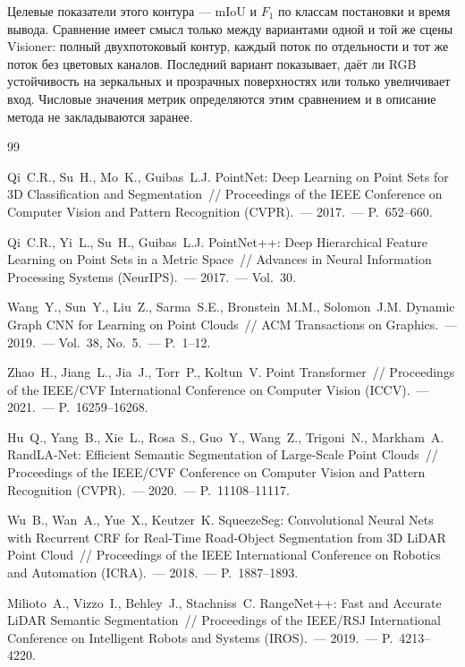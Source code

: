 \documentclass{misisarticle}
\begin{document}
Целевые показатели этого контура --- mIoU и $F_1$ по классам постановки и время вывода. Сравнение имеет смысл только между вариантами одной и той же сцены Visioner: полный двухпотоковый контур, каждый поток по отдельности и тот же поток без цветовых каналов. Последний вариант показывает, даёт ли RGB устойчивость на зеркальных и прозрачных поверхностях или только увеличивает вход. Числовые значения метрик определяются этим сравнением и в описание метода не закладываются заранее.

\begin{thebibliography}{99}

 Qi~C.R., Su~H., Mo~K., Guibas~L.J. PointNet: Deep Learning on Point Sets for 3D Classification and Segmentation~// Proceedings of the IEEE Conference on Computer Vision and Pattern Recognition (CVPR).~--- 2017.~--- P.~652--660.

 Qi~C.R., Yi~L., Su~H., Guibas~L.J. PointNet++: Deep Hierarchical Feature Learning on Point Sets in a Metric Space~// Advances in Neural Information Processing Systems (NeurIPS).~--- 2017.~--- Vol.~30.

 Wang~Y., Sun~Y., Liu~Z., Sarma~S.E., Bronstein~M.M., Solomon~J.M. Dynamic Graph CNN for Learning on Point Clouds~// ACM Transactions on Graphics.~--- 2019.~--- Vol.~38, No.~5.~--- P.~1--12.

 Zhao~H., Jiang~L., Jia~J., Torr~P., Koltun~V. Point Transformer~// Proceedings of the IEEE/CVF International Conference on Computer Vision (ICCV).~--- 2021.~--- P.~16259--16268.

 Hu~Q., Yang~B., Xie~L., Rosa~S., Guo~Y., Wang~Z., Trigoni~N., Markham~A. RandLA-Net: Efficient Semantic Segmentation of Large-Scale Point Clouds~// Proceedings of the IEEE/CVF Conference on Computer Vision and Pattern Recognition (CVPR).~--- 2020.~--- P.~11108--11117.

 Wu~B., Wan~A., Yue~X., Keutzer~K. SqueezeSeg: Convolutional Neural Nets with Recurrent CRF for Real-Time Road-Object Segmentation from 3D LiDAR Point Cloud~// Proceedings of the IEEE International Conference on Robotics and Automation (ICRA).~--- 2018.~--- P.~1887--1893.

 Milioto~A., Vizzo~I., Behley~J., Stachniss~C. RangeNet++: Fast and Accurate LiDAR Semantic Segmentation~// Proceedings of the IEEE/RSJ International Conference on Intelligent Robots and Systems (IROS).~--- 2019.~--- P.~4213--4220.


\end{thebibliography}
\end{document}
